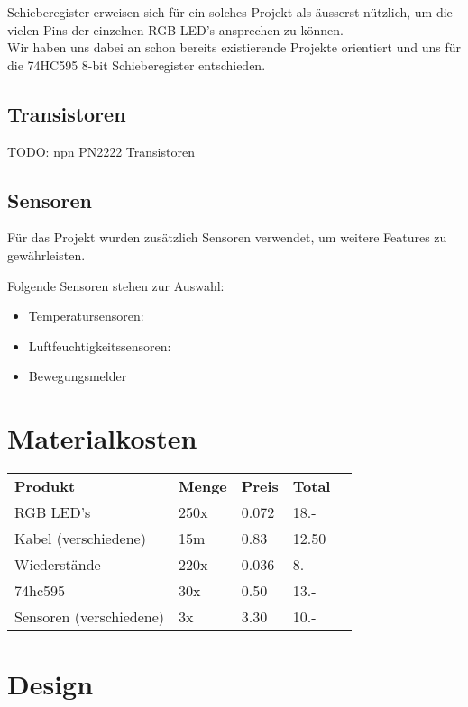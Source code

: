 \documentclass[12pt,a4paper]{article}
\begin{document}
Schieberegister erweisen sich für ein solches Projekt als äusserst nützlich, um die vielen Pins der einzelnen RGB LED's ansprechen zu können. \\

Wir haben uns dabei an schon bereits existierende Projekte orientiert und uns für die 74HC595 8-bit Schieberegister entschieden.

\subsection{Transistoren}

TODO: npn PN2222 Transistoren

\subsection{Sensoren}

Für das Projekt wurden zusätzlich Sensoren verwendet, um weitere Features zu gewährleisten.

Folgende Sensoren stehen zur Auswahl:
\begin{itemize}
    \item Temperatursensoren:
    \item Luftfeuchtigkeitssensoren:
    \item Bewegungsmelder
\end{itemize}

\section{Materialkosten}

\begin{tabularx}{\textwidth}{p{} | l | l | l | r |}
    \textbf{Produkt} & \textbf{Menge} & \textbf{Preis} & \textbf{Total} \\
    \cline{1-4}
    RGB LED's & 250x & 0.072 & 18.- \\
    \cline{1-4}
    Kabel (verschiedene) & 15m & 0.83 & 12.50 \\
    \cline{1-4}
    Wiederstände & 220x & 0.036 & 8.- \\
    \cline{1-4}
    74hc595 & 30x & 0.50 & 13.- \\
    \cline{1-4}
    Sensoren (verschiedene) & 3x & 3.30 & 10.- \\
    
\end{tabularx}

\section{Design}
\end{document}
